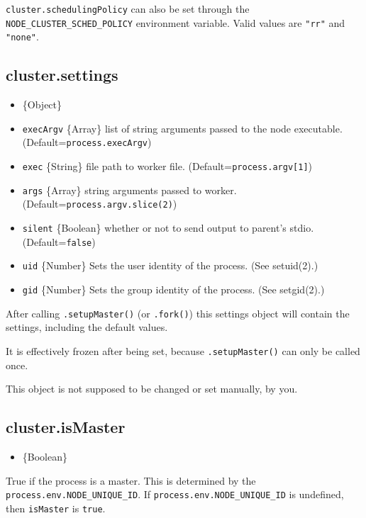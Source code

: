 \texttt{cluster.schedulingPolicy} can also be set through the
\texttt{NODE\_CLUSTER\_SCHED\_POLICY} environment variable. Valid values
are \texttt{"rr"} and \texttt{"none"}.

\subsection{cluster.settings}\label{cluster.settings}

\begin{itemize}
\itemsep1pt\parskip0pt
\item
  \{Object\}
\item
  \texttt{execArgv} \{Array\} list of string arguments passed to the
  node executable. (Default=\texttt{process.execArgv})
\item
  \texttt{exec} \{String\} file path to worker file.
  (Default=\texttt{process.argv{[}1{]}})
\item
  \texttt{args} \{Array\} string arguments passed to worker.
  (Default=\texttt{process.argv.slice(2)})
\item
  \texttt{silent} \{Boolean\} whether or not to send output to parent's
  stdio. (Default=\texttt{false})
\item
  \texttt{uid} \{Number\} Sets the user identity of the process. (See
  setuid(2).)
\item
  \texttt{gid} \{Number\} Sets the group identity of the process. (See
  setgid(2).)
\end{itemize}

After calling \texttt{.setupMaster()} (or \texttt{.fork()}) this
settings object will contain the settings, including the default values.

It is effectively frozen after being set, because
\texttt{.setupMaster()} can only be called once.

This object is not supposed to be changed or set manually, by you.

\subsection{cluster.isMaster}\label{cluster.ismaster}

\begin{itemize}
\itemsep1pt\parskip0pt
\item
  \{Boolean\}
\end{itemize}

True if the process is a master. This is determined by the
\texttt{process.env.NODE\_UNIQUE\_ID}. If
\texttt{process.env.NODE\_UNIQUE\_ID} is undefined, then
\texttt{isMaster} is \texttt{true}.

